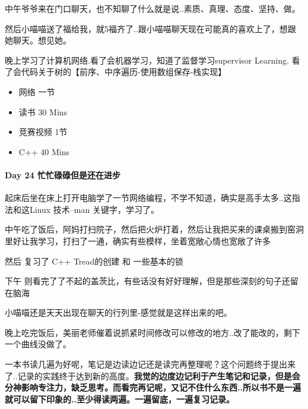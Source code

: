 \documentclass[UTF8,a4paper,8pt]{ctexart}
\begin{document}
	     中午爷爷来在门口聊天，也不知聊了什么就是说..素质、真理、态度、坚持、做。
	     
	     然后小喵喵送了福给我，就5福齐了..跟小喵喵聊天现在可能真的喜欢上了，想跟她聊天。想见她。
	     
	     晚上学习了计算机网络.看了会机器学习，知道了监督学习supervisor Learning. 看了会代码关于树的【前序、中序遍历-使用数组保存-栈实现】
	     \begin{itemize}
	     	\item  \makebox[0pt][l]{$\square$}\raisebox{.15ex}{\hspace{0.1em}$\checkmark$}网络  一节
	     	
	     	\item  \makebox[0pt][l]{$\square$}\raisebox{.15ex}{\hspace{0.1em}$\checkmark$}读书  30 Mins		 	
	     	\item  竞赛视频 1节
	     	\item  C++   40 Mins
	     \end{itemize}
     \paragraph{Day 24   忙忙碌碌但是还在进步   \quad     }
	     
		     起床后坐在床上打开电脑学了一节网络编程，不学不知道，确实是高手太多..这指法和这Linux 技术--man 关键字，学习了。
		     
		     
		     中午吃了饭后，阿妈打扫院子，然后把火炉打着，然后让我把买来的课桌搬到窑洞里好让我学习，打扫了一通，确实有些模样，坐着宽敞心情也宽敞了许多
		     
		     然后 复习了 C++ Tread的创建 和 一些基本的锁
	     
		     下午 则看完了了不起的盖茨比，有些话没有好好理解，但是那些深刻的句子还留在脑海
		     
		     小喵喵还是天天出现在聊天的行列里-感觉就是这样出来的吧。
		     
		     晚上吃完饭后，美丽老师催着说抓紧时间修改可以修改的地方..改了能改的，剩下一个曲线没做了。
	     
		     一本书读几遍为好呢，笔记是边读边记还是读完再整理呢？这个问题终于提出来了..记录的实践终于达到新的高度。\textbf{我觉的边度边记利于产生笔记和记录，但是会分神影响专注力，缺乏思考。而看完再记呢，又记不住什么东西..所以书不是一遍就可以留下印象的..至少得读两遍。一遍留底，一遍复习记录。}
		     
\end{document}
